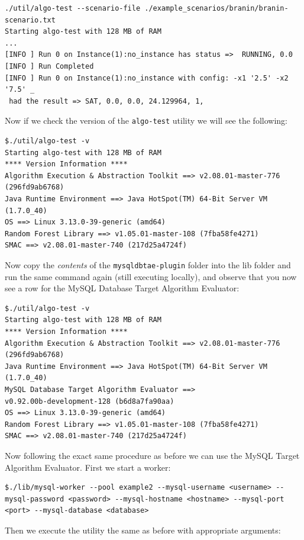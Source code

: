 \documentclass[11pt,letterpaper,oneside]{article}
\begin{document}
\begin{verbatim}
./util/algo-test --scenario-file ./example_scenarios/branin/branin-scenario.txt 
Starting algo-test with 128 MB of RAM
...
[INFO ] Run 0 on Instance(1):no_instance has status =>  RUNNING, 0.0
[INFO ] Run Completed
[INFO ] Run 0 on Instance(1):no_instance with config: -x1 '2.5' -x2 '7.5' _
 had the result => SAT, 0.0, 0.0, 24.129964, 1, 
\end{verbatim}

Now if we check the version of the \texttt{algo-test} utility we will see the following:
\begin{verbatim}
$./util/algo-test -v
Starting algo-test with 128 MB of RAM
**** Version Information ****
Algorithm Execution & Abstraction Toolkit ==> v2.08.01-master-776 (296fd9ab6768)
Java Runtime Environment ==> Java HotSpot(TM) 64-Bit Server VM (1.7.0_40)
OS ==> Linux 3.13.0-39-generic (amd64)
Random Forest Library ==> v1.05.01-master-108 (7fba58fe4271)
SMAC ==> v2.08.01-master-740 (217d25a4724f)
\end{verbatim}

Now copy the \emph{contents} of the \texttt{mysqldbtae-plugin} folder into the lib folder and run the same command again (still executing locally), and observe that you now see a row for the MySQL Database Target Algorithm Evaluator:

\begin{verbatim}
$./util/algo-test -v
Starting algo-test with 128 MB of RAM
**** Version Information ****
Algorithm Execution & Abstraction Toolkit ==> v2.08.01-master-776 (296fd9ab6768)
Java Runtime Environment ==> Java HotSpot(TM) 64-Bit Server VM (1.7.0_40)
MySQL Database Target Algorithm Evaluator ==> 
v0.92.00b-development-128 (b6d8a7fa90aa)
OS ==> Linux 3.13.0-39-generic (amd64)
Random Forest Library ==> v1.05.01-master-108 (7fba58fe4271)
SMAC ==> v2.08.01-master-740 (217d25a4724f)
\end{verbatim}

Now following the exact same procedure as before we can use the MySQL Target Algorithm Evaluator. First we start a worker:

\begin{verbatim}
$./lib/mysql-worker --pool example2 --mysql-username <username> --mysql-password <password> --mysql-hostname <hostname> --mysql-port <port> --mysql-database <database>
\end{verbatim}

Then we execute the utility the same as before with appropriate arguments:
\end{document}
